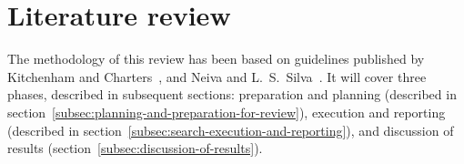 \section{Literature review}\label{sec:literature-review}

The methodology of this review has been based on guidelines published by Kitchenham and Charters~\cite{kitchenham_guidelines_2007}, and Neiva and L.~S.~Silva~\cite{neiva_systematic_2016}.
It will cover three phases, described in subsequent sections: preparation and planning (described in section~\ref{subsec:planning-and-preparation-for-review}), execution and reporting (described in section~\ref{subsec:search-execution-and-reporting}), and discussion of results (section~\ref{subsec:discussion-of-results}).






